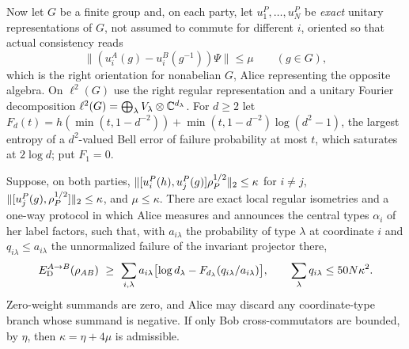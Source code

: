 Now let $G$ be a finite group and, on each party, let $u^P_1,\dots,u^P_N$ be \emph{exact} unitary representations of $G$,
not assumed to commute for different $i$, oriented so that actual consistency reads
\begin{equation}\label{eq:group-mirror}
\|(u^A_i(g)-u^B_i(g^{-1}))\Psi\|\le\mu\qquad(g\in G),
\end{equation}
which is the right orientation for nonabelian $G$, Alice representing the opposite algebra. On $\ell^2(G)$ use the right
regular representation and a unitary Fourier decomposition $\ell^2(G)=\bigoplus_\lambda V_\lambda\otimes\mathbb C^{d_\lambda}$.
For $d\ge2$ let $F_d(t)=h(\min(t,1-d^{-2}))+\min(t,1-d^{-2})\log(d^2-1)$, the largest entropy of a $d^2$-valued Bell error
of failure probability at most $t$, which saturates at $2\log d$; put $F_1=0$.

\begin{theorem}\label{thm:group-extract}
Suppose, on both parties, $\lVert [u^P_i(h),u^P_j(g)]\rho_P^{1/2}\rVert_2\le\kappa$ for $i\ne j$, $\lVert [u^P_j(g),\rho_P^{1/2}]\rVert_2\le\kappa$,
and $\mu\le\kappa$. There are exact local regular isometries and a one-way protocol in which Alice measures and announces
the central types $\alpha_i$ of her label factors, such that, with $a_{i\lambda}$ the probability of type $\lambda$ at
coordinate $i$ and $q_{i\lambda}\le a_{i\lambda}$ the unnormalized failure of the invariant projector there,
\[
\ED^{A\to B}(\rho_{AB})\ \ge\ \sum_{i,\lambda}a_{i\lambda}\bigl[\log d_\lambda-F_{d_\lambda}(q_{i\lambda}/a_{i\lambda})\bigr],
\qquad\sum_\lambda q_{i\lambda}\le50N\kappa^2 .
\]
Zero-weight summands are zero, and Alice may discard any coordinate-type branch whose summand is negative. If only Bob
cross-commutators are bounded, by $\eta$, then $\kappa=\eta+4\mu$ is admissible.
\end{theorem}

